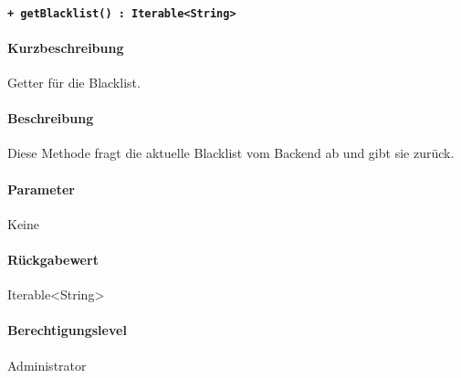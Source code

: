 \paragraph{\texttt{+ getBlacklist() : Iterable<String>}}%
\paragraph*{Kurzbeschreibung}
Getter für die Blacklist.
\paragraph*{Beschreibung}
Diese Methode fragt die aktuelle Blacklist vom Backend ab und gibt sie zurück.
\paragraph*{Parameter}
Keine
\paragraph*{Rückgabewert}
Iterable<String>
\paragraph*{Berechtigungslevel}
Administrator